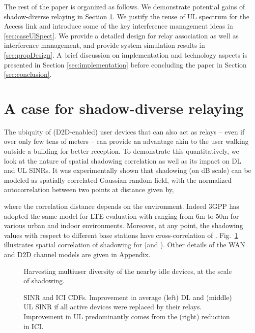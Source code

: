 \documentclass[journal]{IEEEtran}
\begin{document}
The rest of the paper is organized as follows.
We demonstrate potential gains of  shadow-diverse relaying in Section \ref{sec:caseOppRly}.
We justify the reuse of UL spectrum for the Access link and introduce some of the key interference management ideas in \ref{sec:caseUlSpect}.
We provide a detailed design for relay association as well as interference management, and provide system simulation results in \ref{sec:propDesign}.
A brief discussion on implementation and technology aspects is presented in Section \ref{sec:implementation} before concluding the paper in Section \ref{sec:conclusion}.



\section{A case for shadow-diverse relaying}
\label{sec:caseOppRly}

The ubiquity of (D2D-enabled) user devices that can also act as relays -- even if over only few tens of meters -- can provide an advantage akin to the user walking outside a building for better reception. To demonstrate this quantitatively, we look at the nature of spatial shadowing correlation as well as its impact on DL and UL SINRs.  It was experimentally shown \cite{Gudmundson91} that shadowing (on dB scale) can be modeled as spatially correlated Gaussian random field, with the normalized autocorrelation between two points at distance  given by,

where the correlation distance  depends on the environment.  Indeed 3GPP has adopted the same model for LTE  evaluation \cite[Sec.~B.1.2.1.1]{3GPP36814} with  ranging from 6m to 50m for various urban and indoor environments.  Moreover, at any point, the shadowing values with respect to different base stations have cross-correlation of . Fig.~\ref{fig:concept} illustrates spatial correlation of shadowing for  (and ). Other details of the WAN and D2D channel models are given in Appendix.

\begin{figure}
\centering
{}
\caption{Harvesting multiuser diversity of the nearby idle devices, at the scale of shadowing. }
\label{fig:concept}
\end{figure}
\begin{figure*}
\centering
{}
\caption{SINR and ICI CDFs.  Improvement in average (left) DL and (middle) UL SINR if all active devices were replaced by their relays. Improvement in UL predominantly comes from the (right) reduction in ICI.}
\label{fig:upperBound}
\end{figure*}
\end{document}
